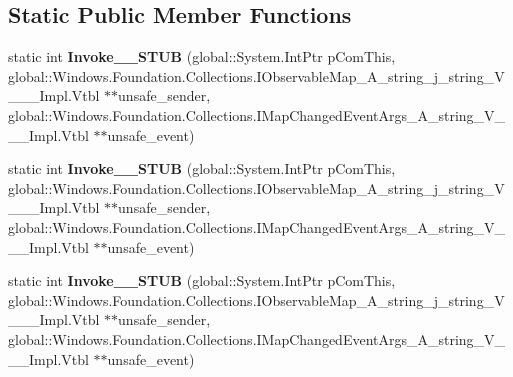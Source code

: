 \subsection*{Static Public Member Functions}
\begin{DoxyCompactItemize}
\item 
\mbox{\label{struct_windows_1_1_foundation_1_1_collections_1_1_map_changed_event_handler___a__string__j__string___v_______impl_1_1_vtbl_a8b35fa2f78ae2572b5c40854f4f64d5e}} 
static int {\bfseries Invoke\+\_\+\+\_\+\+S\+T\+UB} (global\+::\+System.\+Int\+Ptr p\+Com\+This, global\+::\+Windows.\+Foundation.\+Collections.\+I\+Observable\+Map\+\_\+\+A\+\_\+string\+\_\+j\+\_\+string\+\_\+\+V\+\_\+\+\_\+\+\_\+\+Impl.\+Vtbl $\ast$$\ast$unsafe\+\_\+sender, global\+::\+Windows.\+Foundation.\+Collections.\+I\+Map\+Changed\+Event\+Args\+\_\+\+A\+\_\+string\+\_\+\+V\+\_\+\+\_\+\+\_\+\+Impl.\+Vtbl $\ast$$\ast$unsafe\+\_\+event)
\item 
\mbox{\label{struct_windows_1_1_foundation_1_1_collections_1_1_map_changed_event_handler___a__string__j__string___v_______impl_1_1_vtbl_a8b35fa2f78ae2572b5c40854f4f64d5e}} 
static int {\bfseries Invoke\+\_\+\+\_\+\+S\+T\+UB} (global\+::\+System.\+Int\+Ptr p\+Com\+This, global\+::\+Windows.\+Foundation.\+Collections.\+I\+Observable\+Map\+\_\+\+A\+\_\+string\+\_\+j\+\_\+string\+\_\+\+V\+\_\+\+\_\+\+\_\+\+Impl.\+Vtbl $\ast$$\ast$unsafe\+\_\+sender, global\+::\+Windows.\+Foundation.\+Collections.\+I\+Map\+Changed\+Event\+Args\+\_\+\+A\+\_\+string\+\_\+\+V\+\_\+\+\_\+\+\_\+\+Impl.\+Vtbl $\ast$$\ast$unsafe\+\_\+event)
\item 
\mbox{\label{struct_windows_1_1_foundation_1_1_collections_1_1_map_changed_event_handler___a__string__j__string___v_______impl_1_1_vtbl_a8b35fa2f78ae2572b5c40854f4f64d5e}} 
static int {\bfseries Invoke\+\_\+\+\_\+\+S\+T\+UB} (global\+::\+System.\+Int\+Ptr p\+Com\+This, global\+::\+Windows.\+Foundation.\+Collections.\+I\+Observable\+Map\+\_\+\+A\+\_\+string\+\_\+j\+\_\+string\+\_\+\+V\+\_\+\+\_\+\+\_\+\+Impl.\+Vtbl $\ast$$\ast$unsafe\+\_\+sender, global\+::\+Windows.\+Foundation.\+Collections.\+I\+Map\+Changed\+Event\+Args\+\_\+\+A\+\_\+string\+\_\+\+V\+\_\+\+\_\+\+\_\+\+Impl.\+Vtbl $\ast$$\ast$unsafe\+\_\+event)

\end{DoxyCompactItemize}
